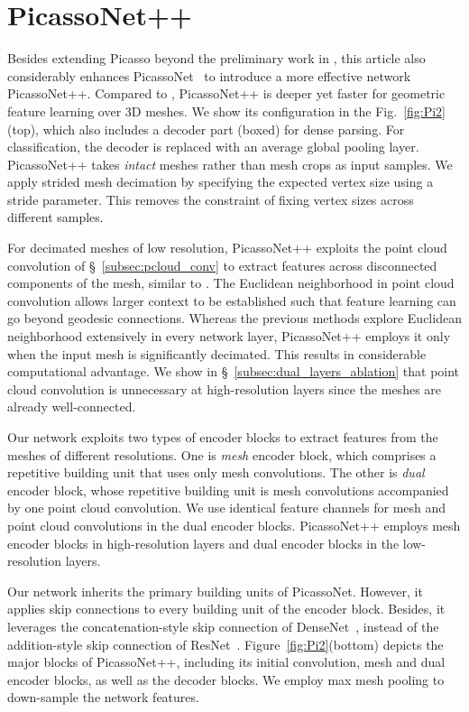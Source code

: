 \section{PicassoNet++}\label{sec:network_Pi2}
Besides extending Picasso beyond the preliminary work in \cite{lei2021picasso}, this article also considerably enhances PicassoNet~\cite{lei2021picasso} to introduce a more effective network  PicassoNet++. 
Compared to \cite{lei2021picasso}, PicassoNet++ is deeper  yet faster for geometric feature learning over 3D meshes. 
We show its configuration in the Fig.~\ref{fig:Pi2}(top), which also  includes a decoder part (boxed) for dense
parsing. For classification, the decoder is replaced with an average global pooling layer. PicassoNet++ takes \textit{intact} meshes rather than mesh crops as input samples.  
We apply strided mesh decimation by specifying the expected vertex size using a stride parameter. This removes the 
constraint of fixing vertex sizes across different samples. 

{\color{black}
For decimated meshes of low resolution, 
PicassoNet++ exploits the point cloud convolution of \S~\ref{subsec:pcloud_conv} to extract features across disconnected components of the mesh, similar to \cite{lei2021picasso}.
The Euclidean neighborhood in point cloud convolution allows larger context to be established such that feature learning can go beyond geodesic connections. 
Whereas the previous methods \cite{lei2021picasso,schult2020dualconvmesh} explore Euclidean neighborhood extensively in every 
network layer, PicassoNet++ employs it only when the input mesh is significantly decimated. This results in considerable computational advantage. 
We show in \S~\ref{subsec:dual_layers_ablation} that point cloud convolution is unnecessary at high-resolution layers since the meshes are already well-connected. 

Our network exploits two types of encoder blocks to extract features from the meshes of different resolutions. One is \textit{mesh} encoder block, which comprises a repetitive building unit that uses only mesh convolutions. The other is \textit{dual} encoder block, whose repetitive building unit is mesh convolutions accompanied by one point cloud convolution. We use identical feature channels for mesh and point cloud convolutions in the dual encoder blocks. PicassoNet++ employs mesh encoder blocks in high-resolution layers and dual encoder blocks in the low-resolution layers.}
Our network inherits the primary building units of PicassoNet. However, it applies skip connections to every building unit of the encoder block. Besides, it leverages the concatenation-style skip connection of DenseNet~\cite{huang2017densely}, instead of the addition-style skip connection of ResNet~\cite{he2016deep}.
Figure~\ref{fig:Pi2}(bottom) depicts the major blocks of PicassoNet++, including its initial convolution, mesh and dual encoder blocks, as well as the decoder blocks. We employ max mesh pooling to down-sample the network features.

